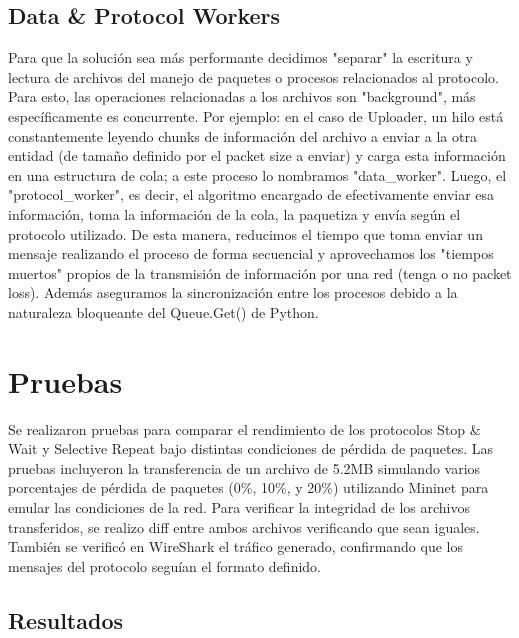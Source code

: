 \documentclass[a4paper,10pt]{article}
\begin{document}
\subsection{Data \& Protocol Workers}
Para que la solución sea más performante decidimos "separar" la escritura y lectura de archivos del manejo de paquetes o procesos relacionados al protocolo. Para esto, las operaciones relacionadas a los archivos son "background", más específicamente es concurrente. Por ejemplo: en el caso de Uploader, un hilo está constantemente leyendo chunks de información del archivo a enviar a la otra entidad (de tamaño definido por el packet size a enviar) y carga esta información en una estructura de cola; a este proceso lo nombramos "data\_worker". Luego, el "protocol\_worker", es decir, el algoritmo encargado de efectivamente enviar esa información, toma la información de la cola, la paquetiza y envía según el protocolo utilizado.
De esta manera, reducimos el tiempo que toma enviar un mensaje realizando el proceso de forma secuencial y aprovechamos los "tiempos muertos" propios de la transmisión de información por una red (tenga o no packet loss). Además aseguramos la sincronización entre los procesos debido a la naturaleza bloqueante del Queue.Get() de Python. 

\section{Pruebas}
Se realizaron pruebas para comparar el rendimiento de los protocolos Stop \& Wait y Selective Repeat bajo distintas condiciones de pérdida de paquetes. Las pruebas incluyeron la transferencia de un archivo de 5.2MB simulando varios porcentajes de pérdida de paquetes (0\%, 10\%, y 20\%) utilizando Mininet para emular las condiciones de la red. Para verificar la integridad de los archivos transferidos, se realizo diff entre ambos archivos verificando que sean iguales. También se verificó en WireShark el tráfico generado, confirmando que los mensajes del protocolo seguían el formato definido.

\subsection*{Resultados}
\end{document}
